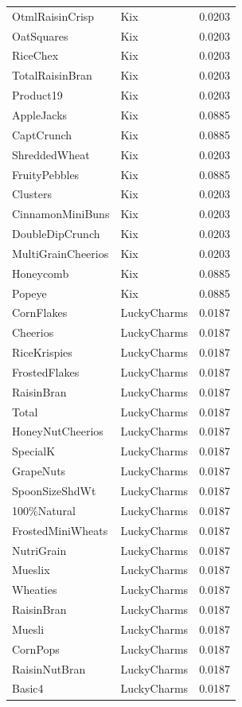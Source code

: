 \begin{longtable}{llr}
OtmlRaisinCrisp & Kix & 0.0203 \\
OatSquares & Kix & 0.0203 \\
RiceChex & Kix & 0.0203 \\
TotalRaisinBran & Kix & 0.0203 \\
Product19 & Kix & 0.0203 \\
AppleJacks & Kix & 0.0885 \\
CaptCrunch & Kix & 0.0885 \\
ShreddedWheat & Kix & 0.0203 \\
FruityPebbles & Kix & 0.0885 \\
Clusters & Kix & 0.0203 \\
CinnamonMiniBuns & Kix & 0.0203 \\
DoubleDipCrunch & Kix & 0.0203 \\
MultiGrainCheerios & Kix & 0.0203 \\
Honeycomb & Kix & 0.0885 \\
Popeye & Kix & 0.0885 \\
CornFlakes & LuckyCharms & 0.0187 \\
Cheerios & LuckyCharms & 0.0187 \\
RiceKrispies & LuckyCharms & 0.0187 \\
FrostedFlakes & LuckyCharms & 0.0187 \\
RaisinBran & LuckyCharms & 0.0187 \\
Total & LuckyCharms & 0.0187 \\
HoneyNutCheerios & LuckyCharms & 0.0187 \\
SpecialK & LuckyCharms & 0.0187 \\
GrapeNuts & LuckyCharms & 0.0187 \\
SpoonSizeShdWt & LuckyCharms & 0.0187 \\
100\%Natural & LuckyCharms & 0.0187 \\
FrostedMiniWheats & LuckyCharms & 0.0187 \\
NutriGrain & LuckyCharms & 0.0187 \\
Mueslix & LuckyCharms & 0.0187 \\
Wheaties & LuckyCharms & 0.0187 \\
RaisinBran & LuckyCharms & 0.0187 \\
Muesli & LuckyCharms & 0.0187 \\
CornPops & LuckyCharms & 0.0187 \\
RaisinNutBran & LuckyCharms & 0.0187 \\
Basic4 & LuckyCharms & 0.0187 \\

\end{longtable}
